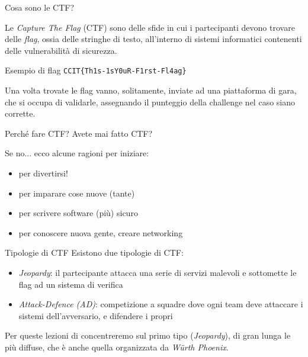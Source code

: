 \documentclass[12pt]{beamer}
\begin{document}
\begin{frame}{Cosa sono le CTF?}

Le \textit{Capture The Flag} (CTF) sono delle sfide in cui i partecipanti 
devono trovare delle \textit{flag}, ossia delle stringhe di testo, all'interno
di sistemi informatici contenenti delle vulnerabilità di sicurezza. 
\vfill
\begin{exampleblock}{Esempio di flag}
\texttt{CCIT\{Th1s-1sY0uR-F1rst-Fl4ag\}}
\end{exampleblock}
\vfill
Una volta trovate le flag vanno, solitamente, inviate ad una piattaforma di gara, 
che si occupa di validarle, assegnando il punteggio della challenge nel caso siano corrette.
\end{frame}

\begin{frame}{Perché fare CTF?}
Avete mai fatto CTF?

\pause\vfill

Se no... ecco alcune ragioni per iniziare:
\pause\vfill
\begin{itemize}
\item per divertirsi!
\pause\vfill
\item per imparare cose nuove (tante)
\pause\vfill
\item per scrivere software (più) sicuro
\pause\vfill
\item per conoscere nuova gente, creare networking
\end{itemize}
\end{frame}

\begin{frame}{Tipologie di CTF}
Esistono due tipologie di CTF:
\begin{itemize}
    \item \textit{Jeopardy}: il partecipante attacca una serie di servizi malevoli e sottomette le flag ad un sistema di verifica
    \item \textit{Attack-Defence (AD)}: competizione a squadre dove ogni team deve attaccare i sistemi dell'avversario, e difendere i propri
\end{itemize}

\vfill
Per queste lezioni di concentreremo sul primo tipo (\textit{Jeopardy}), di gran lunga le più diffuse, che è anche
quella organizzata da \textit{Würth Phoenix}.
\end{frame}
\end{document}
